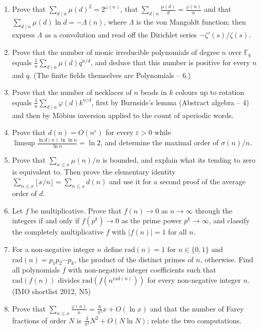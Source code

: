 \documentclass[11pt,a4paper]{article}
\renewcommand{\le}{\leqslant}
\begin{document}
\begin{enumerate}[leftmargin=2.2em,itemsep=0.6em]
\item Prove that $\sum_{d\mid n}\mu(d)^2=2^{\omega(n)}$, that
$\sum_{d\mid n}\frac{\mu(d)}d=\frac{\varphi(n)}n$ and that $\sum_{d\mid n}\mu(d)\ln d=-\Lambda(n)$,
where $\Lambda$ is the von Mangoldt function; then express $\Lambda$ as a convolution and read off
the Dirichlet series $-\zeta'(s)/\zeta(s)$.

\item Prove that the number of monic irreducible polynomials of degree $n$ over $\mathbb F_q$
equals $\frac1n\sum_{d\mid n}\mu(d)q^{n/d}$, and deduce that this number is positive for every $n$
and $q$. (The finite fields themselves are Polynomials -- 6.)

\item Prove that the number of necklaces of $n$ beads in $k$ colours up to rotation equals
$\frac1n\sum_{d\mid n}\varphi(d)k^{n/d}$, first by Burnside's lemma (Abstract algebra -- 4) and
then by M\"obius inversion applied to the count of aperiodic words.

\item Prove that $d(n)=O(n^\varepsilon)$ for every $\varepsilon>0$ while
$\limsup\frac{\ln d(n)\,\ln\ln n}{\ln n}=\ln2$, and determine the maximal order of $\sigma(n)/n$.

\item Prove that $\sum_{n\le x}\mu(n)/n$ is bounded, and explain what its tending to zero is
equivalent to. Then prove the elementary identity
$\sum_{n\le x}\lfloor x/n\rfloor=\sum_{n\le x}d(n)$ and use it for a second proof of the average
order of $d$.

\item Let $f$ be multiplicative. Prove that $f(n)\to0$ as $n\to\infty$ through the integers if and
only if $f(p^k)\to0$ as the prime power $p^k\to\infty$, and classify the completely multiplicative
$f$ with $|f(n)|=1$ for all $n$.

\item For a non-negative integer $n$ define $\mathrm{rad}(n)=1$ for $n\in\{0,1\}$ and
$\mathrm{rad}(n)=p_1p_2\cdots p_k$, the product of the distinct primes of $n$, otherwise. Find all
polynomials $f$ with non-negative integer coefficients such that $\mathrm{rad}(f(n))$ divides
$\mathrm{rad}(f(n^{\mathrm{rad}(n)}))$ for every non-negative integer $n$. (IMO shortlist 2012,
N5)

\item Prove that $\sum_{n\le x}\frac{\varphi(n)}n=\frac6{\pi^2}x+O(\ln x)$ and that the number of
Farey fractions of order $N$ is $\frac3{\pi^2}N^2+O(N\ln N)$; relate the two computations.


\end{enumerate}
\end{document}
